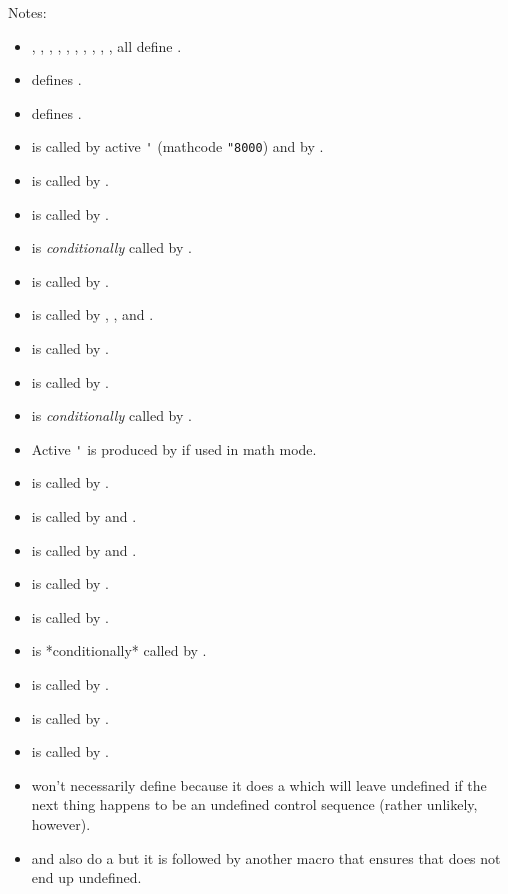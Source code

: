 Notes:
\begin{itemize}
\item \cmd{\iterate}, \cmd{\settabs}, \cmd{\sett@b}, \cmd{\s@tt@b}, 
      \cmd{\t}, \cmd{\prim@s}, \cmd{\ph@nt}, \cmd{\smash},
      \cmd{\vfootnote}, \cmd{\fo@t}, \cmd{\f@@t} all define \cmd{\next}.
\item \cmd{\loop} defines \cmd{\body}.
\item \cmd{\pr@m@s} defines \cmd{\nxt}.
\item \cmd{\prim@s} is called by active \verb?'? (mathcode \verb?"8000?) 
      and by \cmd{\pr@@@s}.
\item \cmd{\iterate} is called by \cmd{\loop}.
\item \cmd{\sett@b} is called by \cmd{\settabs}.
\item \cmd{\s@tt@b} is \emph{conditionally} called by \cmd{\sett@b}.
\item \cmd{\smash} is called by \cmd{\relbar}.
\item \cmd{\ph@nt} is called by \cmd{\phantom}, \cmd{\vphantom}, and 
      \cmd{\hphantom}.
\item \cmd{\vfootnote} is called by \cmd{\footnote}.
\item \cmd{\fo@t} is called by \cmd{\vfootnote}.
\item \cmd{\f@@t} is \emph{conditionally} called by \cmd{\fo@t}.
\item Active \verb?'? is produced by \cmd{\rq} if used in math mode.
\item \cmd{\pr@@@s} is called by \cmd{\pr@m@s}.
\item \cmd{\loop} is called by \cmd{\multispan} and \cmd{\s@tcols}.
\item \cmd{\relbar} is called by \cmd{\longleftarrow} and \cmd{\longrightarrow}.
\item \cmd{\vphantom} is called by \cmd{\mathstrut}.

\item \cmd{\pr@m@s} is called by \cmd{\prim@s}.
\item \cmd{\s@tcols} is *conditionally* called by \cmd{\sett@b}.
\item \cmd{\longrightarrow} is called by \cmd{\longmapsto}.
\item \cmd{\mathstrut} is called by \cmd{\matrix}.

\item \cmd{\matrix} is called by \cmd{\pmatrix}.

\item \cmd{\prim@s} won't necessarily define \cmd{\next} because it does 
a \cmd{\futurelet}
which will leave \cmd{\next} undefined if the next thing happens to be an
undefined control sequence (rather unlikely, however).

\item \cmd{\vfootnote} and \cmd{\settabs} also do a \cmd{\futurelet} but it is followed by
another macro that ensures that \cmd{\next} does not end up undefined.
\end{itemize}

